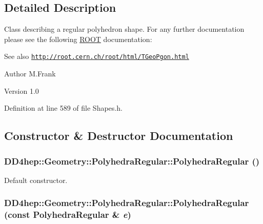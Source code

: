 \subsection{Detailed Description}
Class describing a regular polyhedron shape. For any further documentation please see the following \hyperlink{namespace_r_o_o_t}{ROOT} documentation: \begin{DoxySeeAlso}{See also}
\href{http://root.cern.ch/root/html/TGeoPgon.html}{\tt http://root.cern.ch/root/html/TGeoPgon.html}
\end{DoxySeeAlso}
\begin{DoxyAuthor}{Author}
M.Frank 
\end{DoxyAuthor}
\begin{DoxyVersion}{Version}
1.0 
\end{DoxyVersion}


Definition at line 589 of file Shapes.h.

\subsection{Constructor \& Destructor Documentation}
\hypertarget{class_d_d4hep_1_1_geometry_1_1_polyhedra_regular_ab24a6fb73d056c11d84ab439ad9fa785}{
\subsubsection[{PolyhedraRegular}]{\setlength{\rightskip}{0pt plus 5cm}DD4hep::Geometry::PolyhedraRegular::PolyhedraRegular ()}}
\label{class_d_d4hep_1_1_geometry_1_1_polyhedra_regular_ab24a6fb73d056c11d84ab439ad9fa785}


Default constructor. \hypertarget{class_d_d4hep_1_1_geometry_1_1_polyhedra_regular_ac18aa1f617bfcdbf07aef7aa020d5784}{
\subsubsection[{PolyhedraRegular}]{\setlength{\rightskip}{0pt plus 5cm}DD4hep::Geometry::PolyhedraRegular::PolyhedraRegular (const {\bf PolyhedraRegular} \& {\em e})}}
\label{class_d_d4hep_1_1_geometry_1_1_polyhedra_regular_ac18aa1f617bfcdbf07aef7aa020d5784}


